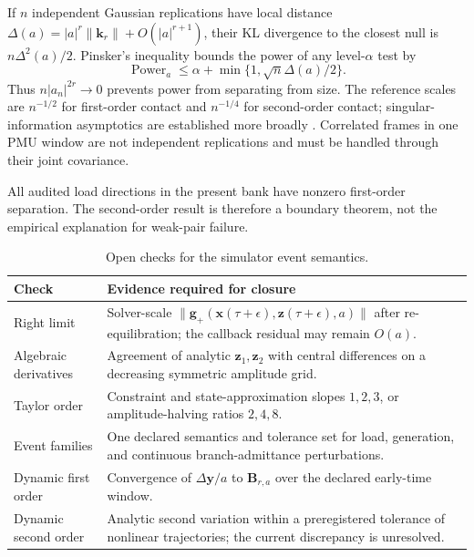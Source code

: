 If $n$ independent Gaussian replications have local distance
$\Delta(a)=|a|^r\|\bm k_r\|+O(|a|^{r+1})$, their KL divergence to the closest null is $n\Delta^2(a)/2$. Pinsker's inequality bounds the power of any level-$\alpha$ test by
\begin{equation}
 \operatorname{Power}_a
 \le \alpha+\min\{1,\sqrt n\Delta(a)/2\}.
 \label{eq:supp-contact-power-bound}
\end{equation}
Thus $n|a_n|^{2r}\rightarrow0$ prevents power from separating from size. The reference scales are $n^{-1/2}$ for first-order contact and $n^{-1/4}$ for second-order contact; singular-information asymptotics are established more broadly \cite{rotnitzky2000singular}. Correlated frames in one PMU window are not independent replications and must be handled through their joint covariance.

All audited load directions in the present bank have nonzero first-order separation. The second-order result is therefore a boundary theorem, not the empirical explanation for weak-pair failure.



\begin{table}[t]
\caption{Open checks for the simulator event semantics.}
\label{tab:supp-semantic-closure}
\centering
\scriptsize
\begin{tabularx}{\columnwidth}{@{}p{}X@{}}
\toprule
Check & Evidence required for closure \\
\midrule
Right limit & Solver-scale $\|\bm g_+(\bm x(\tau+\epsilon),\bm z(\tau+\epsilon),a)\|$ after re-equilibration; the callback residual may remain $O(a)$. \\
Algebraic derivatives & Agreement of analytic $\bm z_1,\bm z_2$ with central differences on a decreasing symmetric amplitude grid. \\
Taylor order & Constraint and state-approximation slopes $1,2,3$, or amplitude-halving ratios $2,4,8$. \\
Event families & One declared semantics and tolerance set for load, generation, and continuous branch-admittance perturbations. \\
Dynamic first order & Convergence of $\Delta\bm y/a$ to $\bm B_{r,a}$ over the declared early-time window. \\
Dynamic second order & Analytic second variation within a preregistered tolerance of nonlinear trajectories; the current discrepancy is unresolved. \\
\bottomrule
\end{tabularx}
\end{table}

